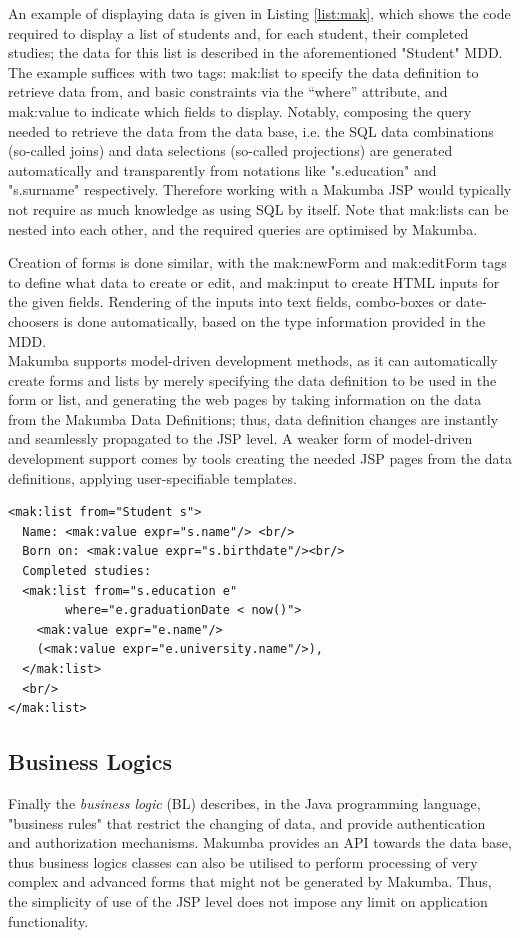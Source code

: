 \documentclass{llncs}
\begin{document}
An example of displaying data is given in Listing \ref{list:mak}, which shows the code required to display a list of students and, for each student, their completed studies; the data for this list is described in the aforementioned "Student" MDD. The example suffices with two tags: mak:list to specify the data definition to retrieve data from, and basic constraints via the ``where'' attribute, and mak:value to indicate which fields to display. Notably, composing the query needed to retrieve the data from the data base, i.e. the SQL data combinations (so-called joins) and data selections (so-called projections) are generated automatically and transparently from notations like "s.education" and "s.surname" respectively. Therefore working with a Makumba JSP would typically not require as much knowledge as using SQL by itself. Note that mak:lists can be nested into each other, and the required queries are optimised by Makumba.

Creation of forms is done similar, with the mak:newForm and mak:editForm tags to define what data to create or edit, and mak:input to create HTML inputs for the given fields. Rendering of the inputs into text fields, combo-boxes or date-choosers is done automatically, based on the type information provided in the MDD.\\

Makumba supports model-driven development methods, as it can automatically create forms and lists by merely specifying the data definition to be used in the form or list, and generating the web pages by taking information on the data from the Makumba Data Definitions; thus, data definition changes are instantly and seamlessly propagated to the JSP level. A weaker form of model-driven development support comes by tools creating the needed JSP pages from the data definitions, applying user-specifiable templates.

\lstset{basicstyle=\small, captionpos=b, caption=Example of viewing data with the Makumba JSP tag library, label=list:mak, frame=shadowbox}
\begin{lstlisting}[t]
<mak:list from="Student s">
  Name: <mak:value expr="s.name"/> <br/>
  Born on: <mak:value expr="s.birthdate"/><br/>
  Completed studies:
  <mak:list from="s.education e"
  	    where="e.graduationDate < now()">
    <mak:value expr="e.name"/>
    (<mak:value expr="e.university.name"/>),
  </mak:list>
  <br/>
</mak:list>
\end{lstlisting}

\subsection{Business Logics}
Finally the \textit{business logic} (BL) describes, in the Java programming language, "business rules" that restrict the changing of data, and provide authentication and authorization mechanisms. Makumba provides an API towards the data base, thus business logics classes can also be utilised to perform processing of very complex and advanced forms that might not be generated by Makumba. Thus, the simplicity of use of the JSP level does not impose any limit on application functionality.\\
\end{document}
